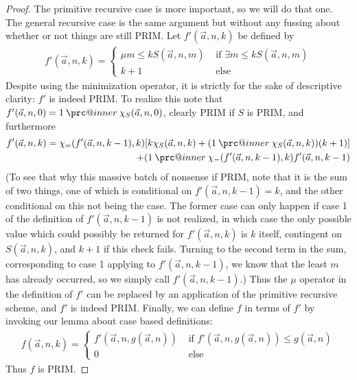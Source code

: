 \documentclass{article}
\makeatletter
\newcommand{\prc}{\mathbin{\mathpalette\prc@inner\relax}}
\newcommand{\prc@inner}[2]{%
  \vbox{\offinterlineskip\m@th
    \ialign{%
      ##\cr
      \hidewidth\raisebox{-1.5\height}[0pt][0pt]{$#1.$}\hidewidth\cr
      $#1-$\cr
    }%
  }%
}
\theoremstyle{definition}
\theoremstyle{plain}
\theoremstyle{theorem}
\makeatother
\begin{document}
\begin{proof}
    The primitive recursive case is more important, so we will do that one. The general recursive case is the same argument but without any fussing about whether or not things are still PRIM. Let $f'(\vec{a},n,k)$ be defined by 
    \begin{align}
        f'(\vec{a},n,k) = \begin{cases}
                              \mu m \leq k S(\vec{a},n,m) & \textrm{  if $\exists m \leq k S(\vec{a},n,m)$} \\
                              k+1 & \textrm{ else}
                          \end{cases}
    \end{align}
    Despite using the minimization operator, it is strictly for the sake of descriptive clarity: $f'$ is indeed PRIM. To realize this note that $f'(\vec{a},n,0) = 1 \prc \chi_S(\vec{a},n,0)$, clearly PRIM if $S$ is PRIM, and furthermore
    \begin{align}
        f'(\vec{a},n,k) = \chi_=(f'(\vec{a},n,k-1),k)[k\chi_S(\vec{a},n,k)+(1 \prc \chi_S(\vec{a},n,k))(k+1)]\\+(1 \prc\chi_=(f'(\vec{a},n,k-1),k)f'(\vec{a},n,k-1)
    \end{align}
    (To see that why this massive batch of nonsense if PRIM, note that it is the sum of two things, one of which is conditional on $f'(\vec{a},n,k-1) = k$, and the other conditional on this not being the case. The former case can only happen if case 1 of the definition of $f'(\vec{a},n,k-1)$ is not realized, in which case the only possible value which could possibly be returned for $f'(\vec{a},n,k)$ is $k$ itself, contingent on $S(\vec{a},n,k)$, and $k+1$ if this check fails. Turning to the second term in the sum, corresponding to case 1 applying to $f'(\vec{a},n,k-1)$, we know that the least $m$ has already occurred, so we simply call $f'(\vec{a},n,k-1)$.) Thus the $\mu$ operator in the definition of $f'$ can be replaced by an application of the primitive recursive scheme, and $f'$ is indeed PRIM. Finally, we can define $f$ in terms of $f'$ by invoking our lemma about case based definitions:
    \begin{align}
        f(\vec{a},n,k) = \begin{cases}
                           f'(\vec{a},n,g(\vec{a},n)) & \textrm{ if $f'(\vec{a},n,g(\vec{a},n)) \leq g(\vec{a},n)$} \\
                           0 & \textrm{ else}
                        \end{cases}
    \end{align}
    Thus $f$ is PRIM. 
\end{proof}
\end{document}
